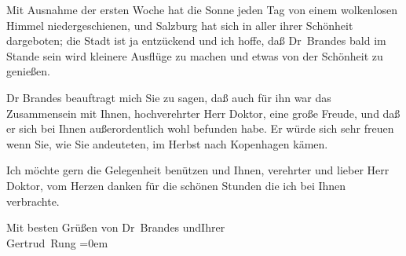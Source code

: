 \pstart
           Mit Ausnahme der ersten Woche hat die Sonne jeden Tag von einem wolkenlosen Himmel
               niedergeschienen, und Salzburg hat sich in aller
               ihrer Schönheit dargeboten; die Stadt ist ja entzückend und ich hoffe, daß Dr Brandes bald im Stande sein wird kleinere
               Ausflüge zu machen und etwas von der Schönheit zu genießen.\pend
           
\pstart
           Dr Brandes beauftragt mich Sie {\pb}zu
               sagen, daß auch für ihn war das Zusammensein mit Ihnen, hochverehrter Herr Doktor,
               eine große Freude, und daß er sich bei Ihnen außerordentlich wohl befunden habe. Er
               würde sich sehr freuen wenn Sie, wie Sie andeuteten, im Herbst nach Kopenhagen kämen.\pend
           
\pstart
           Ich möchte gern die Gelegenheit benützen und Ihnen, verehrter und lieber Herr Doktor,
               vom Herzen danken für die schönen Stunden die ich bei Ihnen verbrachte.\pend
           
\pstart
           Mit besten Grüßen von Dr Brandes
                  und\hspace*{2.5em}Ihrer{\\[\baselineskip]}\spacefill\mbox{Gertrud Rung}\pend
           \leftskip=0em{}\endnumbering{}  \newcommand{\dateiname}{L02441}\newcommand{\titel}{Gertrud Rung an Arthur Schnitzler, 24. 5. 1925}\newcommand{\editorInnen}{Martin Anton Müller und Gerd-Hermann Susen}
